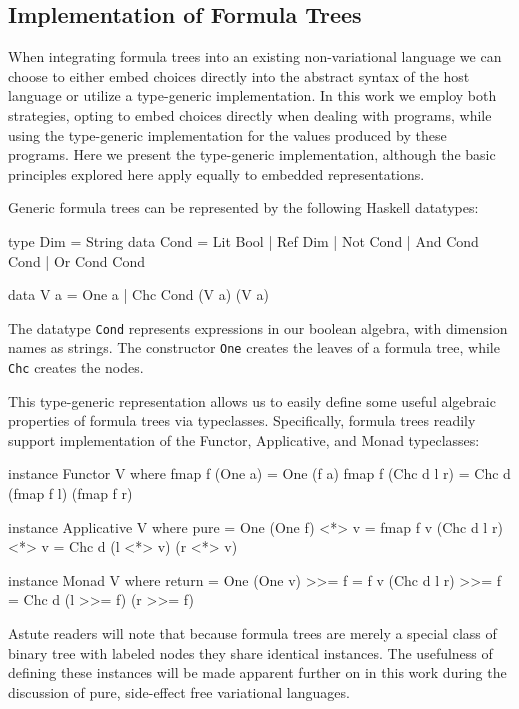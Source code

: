 \documentclass[letterpaper,10pt,onecolumn]{article}
\newcommand{\prog}[1]{{\small\texttt{#1}}}
\begin{document}
\subsection{Implementation of Formula Trees}

When integrating formula trees into an existing non-variational language we can choose to
either embed choices directly into the abstract syntax of the host language or utilize a type-generic
implementation. In this work we employ both strategies, opting to embed choices directly when dealing
with programs, while using the type-generic implementation for the values produced by these programs.
Here we present the type-generic implementation, although the basic principles explored here apply
equally to embedded representations.

Generic formula trees can be represented by the following Haskell datatypes:

\begin{program}
type Dim = String
data Cond =
    Lit Bool
  | Ref Dim
  | Not Cond
  | And Cond Cond
  | Or Cond Cond

data V a = One a | Chc Cond (V a) (V a) 
\end{program}

The datatype \prog{Cond} represents expressions in our boolean algebra, with dimension names as strings.
The constructor \prog{One} creates the leaves of a formula tree, while \prog{Chc} creates the nodes.

This type-generic representation allows us to easily define some useful algebraic properties of
formula trees via typeclasses. Specifically, formula trees readily support implementation of the
Functor, Applicative, and Monad typeclasses:

\begin{program}
instance Functor V where
  fmap f (One a) = One (f a)
  fmap f (Chc d l r) = Chc d (fmap f l) (fmap f r)
  
instance Applicative V where
  pure = One
  (One f) <*> v = fmap f v
  (Chc d l r) <*> v = Chc d (l <*> v) (r <*> v)
  
instance Monad V where
  return = One
  (One v) >>= f = f v
  (Chc d l r) >>= f = Chc d (l >>= f) (r >>= f)
\end{program}

Astute readers will note that because formula trees are merely a special class of binary tree with
labeled nodes they share identical instances. The usefulness of defining these instances will be made
apparent further on in this work during the discussion of pure, side-effect free variational languages.
\end{document}
